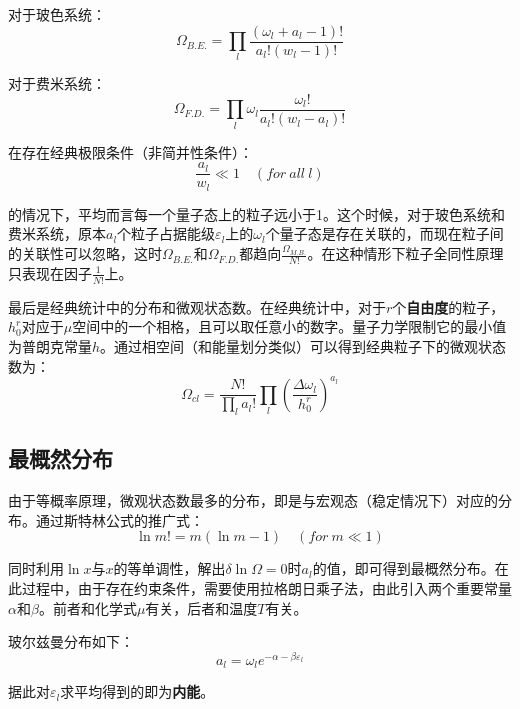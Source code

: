 \documentclass[UTF8]{ctexart}
\newcommand{\firstsection}{\subsection}
\newcommand{\backdoc}{\normalsize}
\begin{document}
	对于玻色系统：
	\begin{equation}
		\Omega_{B.E.}=\prod_{l} \frac{(\omega_{l}+a_{l}-1)!}{a_{l}! (w_{l}-1)!}
	\end{equation}
	
	对于费米系统：
	\begin{equation}
		\Omega_{F.D.}=\prod_{l} \omega_{l} \frac{\omega_{l} !}{a_{l}! (w_{l}-a_{l})!}
	\end{equation}
	
	在存在经典极限条件（非简并性条件）：
	\begin{equation}
		\frac{a_{l}}{w_{l}}\ll 1 \quad(for\ all\ l)
	\end{equation}
	
\noindent 的情况下，平均而言每一个量子态上的粒子远小于1。这个时候，对于玻色系统和费米系统，原本$ a_{l} $个粒子占据能级$ \varepsilon_{l} $上的$ \omega_{l} $个量子态是存在关联的，而现在粒子间的关联性可以忽略，这时$ \Omega_{B.E.} $和$ \Omega_{F.D.} $都趋向$ \frac{\Omega_{M.B.}}{N !} $。在这种情形下粒子全同性原理只表现在因子$ \frac{1}{N !} $上。

	最后是经典统计中的分布和微观状态数。在经典统计中，对于$ r $个\textbf{自由度}的粒子，$ h_{0}^{r} $对应于$ \mu $空间中的一个相格，且可以取任意小的数字。量子力学限制它的最小值为普朗克常量$ h $。通过相空间（和能量划分类似）可以得到经典粒子下的微观状态数为：
	\begin{equation}
		\Omega_{cl}=\frac{N !}{\prod_{l} a_{l} !} \prod_{l} \left(\frac{\Delta \omega_{l}}{h_{0}^r}\right)^{a_{l}}
	\end{equation}
	
	\firstsection{最概然分布}
	
	\backdoc
	由于等概率原理，微观状态数最多的分布，即是与宏观态（稳定情况下）对应的分布。通过斯特林公式的推广式：
	\begin{equation}
		\ln m! =m(\ln m-1) \quad (for\ m \ll 1)\label{equ3}
	\end{equation}
	
\noindent 同时利用$ \ln x $与$ x $的等单调性，解出$ \delta \ln \Omega =0 $时$ a_{l} $的值，即可得到最概然分布。在此过程中，由于存在约束条件，需要使用拉格朗日乘子法，由此引入两个重要常量$ \alpha $和$ \beta $。前者和化学式$ \mu $有关，后者和温度$ T $有关。

	玻尔兹曼分布如下：
	\begin{equation}
		a_{l}=\omega_{l} e^{-\alpha-\beta \varepsilon_{l}}\label{equ1}
	\end{equation}
	
	据此对$ \varepsilon_{l} $求平均得到的即为\textbf{内能}。
	
\end{document}

